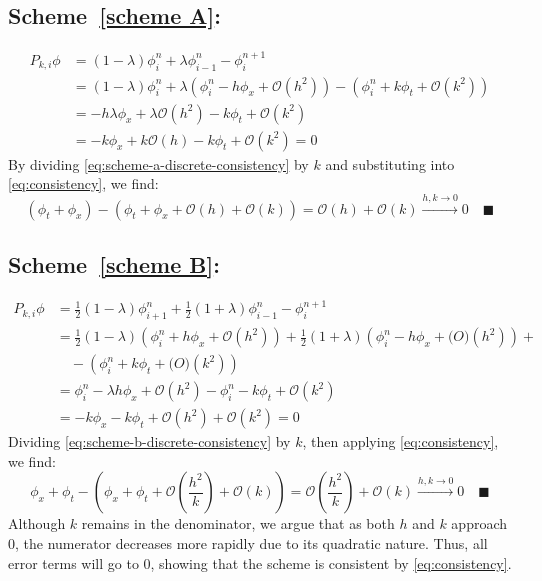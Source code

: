\documentclass{math_hw}
\renewcommand\qedsymbol{\blacksquare}
\theoremstyle{definition}
\begin{document}
    \subsection*{Scheme~\ref{scheme A}:}
    \begin{equation}
        \label{eq:scheme-a-discrete-consistency}
        \begin{split}
            P_{k,i}\phi &=(1-\lambda) \phi_i^n +\lambda \phi_{i-1}^n-\phi_i^{n+1} \\
            &= (1-\lambda)\phi_i^n+\lambda \left( \phi_i^n-h\phi_x+\mathcal{O}(h^2) \right) - \left( \phi_i^n+k\phi_t+\mathcal{O}(k^2) \right)\\
            &=-h\lambda \phi_x + \lambda\mathcal{O}(h^2) -k\phi_t+\mathcal{O}(k^2)\\
            &= -k\phi_x+k\mathcal{O}(h)-k\phi_t+\mathcal{O}(k^2) = 0
        \end{split}
    \end{equation}
    By dividing \cref{eq:scheme-a-discrete-consistency} by $k$ and substituting into \cref{eq:consistency}, we find:
    \begin{equation*}
    (\phi_t+\phi_x)
        - \left( \phi_t+\phi_x+\mathcal{O}(h) + \mathcal{O}(k) \right) =\mathcal{O}(h) + \mathcal{O}(k)\xrightarrow{h,k\to 0} 0 \quad \qedsymbol
    \end{equation*}

    \subsection*{Scheme~\ref{scheme B}:}
    \begin{equation}
        \label{eq:scheme-b-discrete-consistency}
        \begin{split}
            P_{k,i}\phi &= \frac{1}{2}\left( 1-\lambda \right)\phi_{i+1}^n+\frac{1}{2}\left( 1+\lambda \right)\phi_{i-1}^n-\phi_i^{n+1} \\
            &= \frac{1}{2}(1-\lambda)\left( \phi_i^n+h\phi_x+\mathcal{O}(h^2) \right)+\frac{1}{2}(1+\lambda)\left( \phi_i^n-h\phi_x+\mathcal(O)(h^2) \right) +\\ &\quad - \left( \phi_i^n+k\phi_t+\mathcal(O)(k^2) \right) \\
            &=\phi_i^n-\lambda h\phi_x+\mathcal{O}(h^2)-\phi_i^n-k\phi_t+\mathcal{O}(k^2)\\
            &= -k\phi_x-k\phi_t+\mathcal{O}(h^2)+\mathcal{O}(k^2) = 0
        \end{split}
    \end{equation}
    Dividing \cref{eq:scheme-b-discrete-consistency} by $k$, then applying \cref{eq:consistency}, we find:
    \begin{equation*}
        \phi_x+\phi_t-\left( \phi_x+\phi_t + \mathcal{O}\left(\frac{h^2}{k}\right) + \mathcal{O}(k)\right) = \mathcal{O}\left(\frac{h^2}{k}\right) + \mathcal{O}(k)\xrightarrow{h,k\to 0} 0 \quad \qedsymbol
    \end{equation*}
    Although $k$ remains in the denominator, we argue that as both $h$ and $k$ approach 0, the numerator decreases more rapidly due to its quadratic nature.
    Thus, all error terms will go to 0, showing that the scheme is consistent by \cref{eq:consistency}.
\end{document}
